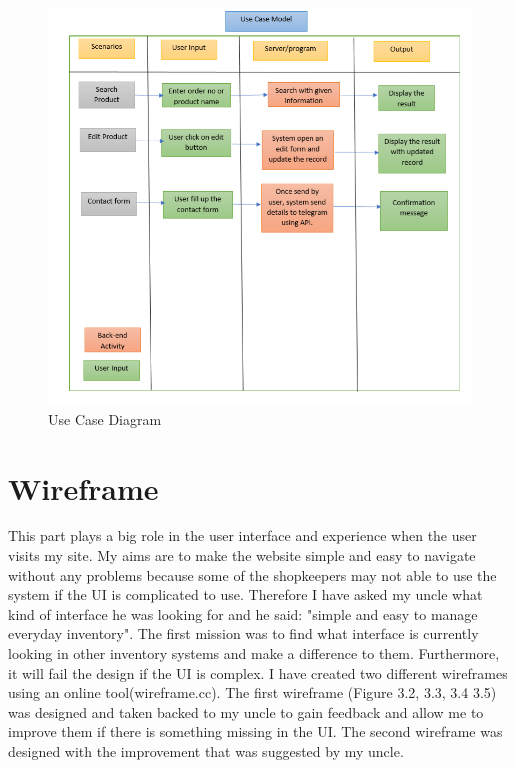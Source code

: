 \begin{figure}[h]
\centering
    \includegraphics[scale=0.55]
    {Diagrams/usecasediagram.png}
    \caption{Use Case Diagram}
    \label{fig:Use case diagram}
\end{figure}

\section{Wireframe}
This part plays a big role in the user interface and experience when the user visits my site. My aims are to make the website simple and easy to navigate without any problems because some of the shopkeepers may not able to use the system if the UI is complicated to use. Therefore I have asked my uncle what kind of interface he was looking for and he said: "simple and easy to manage everyday inventory". The first mission was to find what interface is currently looking in other inventory systems and make a difference to them. Furthermore, it will fail the design if the UI is complex.\newline
\newline I have created two different wireframes using an online tool(wireframe.cc). The first wireframe (Figure 3.2, 3.3, 3.4 3.5) was designed and taken backed to my uncle to gain feedback and allow me to improve them if there is something missing in the UI. The second wireframe was designed with the improvement that was suggested by my uncle.  

